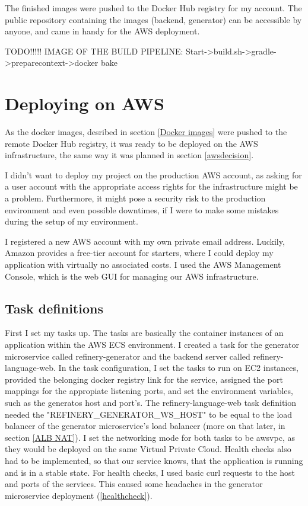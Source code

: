 			The finished images were pushed to the Docker Hub registry for my account. The public repository containing the images (backend,
			generator) can be accessible by anyone, and came in handy for the AWS deployment.

		TODO!!!!! IMAGE OF THE BUILD PIPELINE: Start->build.sh->gradle->preparecontext->docker bake

	\section{Deploying on AWS}
		As the docker images, desribed in section \ref{Docker images} were pushed to the remote Docker Hub registry, it was ready to be deployed on the AWS infrastructure, the 
		same way it was planned in section \ref{awsdecision}.

		I didn't want to deploy my project on the production AWS account, as asking for a user account with the appropriate access rights for the
		infrastructure might be a problem. Furthermore, it might pose a security risk to the production environment and even possible downtimes, if I
		were to make some mistakes during the setup of my environment.

		I registered a new AWS account with my own private email address. Luckily, Amazon provides a free-tier account for starters, where 
		I could deploy my application with virtually no associated costs. I used the AWS Management Console, which is the web GUI for 
		managing our AWS infrastructure.

		\subsection{Task definitions}
			First I set my tasks up. The tasks are basically the container instances of an application within the AWS ECS environment. 
			I created a task
			for the generator microservice called refinery-generator and the backend server called refinery-language-web.
			In the task configuration, I set the tasks to run on EC2 instances, provided the belonging docker registry link for the service,
			assigned the port mappings for the appropiate listening ports, and set the environment variables, 
			such as the generatos host and port's. The refinery-language-web task definition needed the "REFINERY\_GENERATOR\_WS\_HOST" to 
			be equal to the load balancer of the generator microservice's load balancer (more on that later, in section \ref{ALB NAT}).
			I set the networking mode for both tasks to be awsvpc, as they would be deployed on the same Virtual Private Cloud.
			Health checks also had to be implemented, so that our service knows, that the application is running and is in a stable state.
			For health checks, I used basic curl requests to the host and ports of the services. This caused some headaches in the 
			generator microservice deployment (\ref{healthcheck}).

